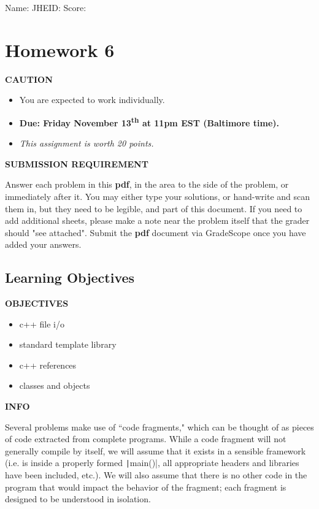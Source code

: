 \documentclass[12pt]{article}
\def \HWNumber {6}
\def \HWDueDate {Friday November 13\textsuperscript{th} at 11pm EST (Baltimore time)}
\newenvironment{caution}{\par\begin{mdframed}[linewidth=1pt,linecolor=YellowOrange]%
		\begin{list}{}{\leftmargin=0cm}\item[\Large\bcdanger]}
		{\end{list}\end{mdframed}\par}
\newenvironment{danger}{\par\begin{mdframed}[linewidth=1pt,linecolor=Red]%
		\begin{list}{}{\leftmargin=0cm}\item[\Large\bcbombe]}
		{\end{list}\end{mdframed}\par}
\newenvironment{tip}{\par\begin{mdframed}[linewidth=1pt,linecolor=ForestGreen]%
		\begin{list}{}{\leftmargin=0cm}\item[\Large\bclampe]}
		{\end{list}\end{mdframed}\par}
\newenvironment{info}{\par\begin{mdframed}[linewidth=1pt,linecolor=Cerulean]%
		\begin{list}{}{\leftmargin=0cm}\item[\Large\bcinfo]}
		{\end{list}\end{mdframed}\par}
\def \SName {}
\def \JHEID {}
\begin{document}
\noindent Name: \framebox[5.5cm]{\SName\rule{0pt}{12pt}} \hfill
JHEID: \framebox[3cm]{\JHEID\rule{0pt}{12pt}}\hfill
Score: \framebox[2cm]{\rule{0pt}{12pt}}

\section*{Homework \HWNumber}

\begin{caution}
	\textbf{CAUTION}
	
	\begin{itemize}
		\item You are expected to work individually.
		\item \textbf{Due: \HWDueDate.}
		\item \textit{This assignment is worth 20 points. }
	\end{itemize}
\end{caution}

\begin{danger}
	\textbf{SUBMISSION REQUIREMENT}
	
	Answer each problem in this \textbf{pdf}, in the area to the side of the problem, or immediately after it.  You may either type your solutions, or hand-write and scan them in, but they need to be legible, and part of this document. If you need to add additional sheets, please make a note near the problem itself that the grader should "see attached". Submit the \textbf{pdf} document via GradeScope once you have added your answers.
\end{danger}

\subsection*{Learning Objectives}
\begin{tip}
	\textbf{OBJECTIVES}
	
	\begin{itemize}
		\item c++ file i/o
		\item standard template library
		\item c++ references
		\item classes and objects
	\end{itemize}
\end{tip}

\begin{info}
	\textbf{INFO}
	
	Several problems make use of “code fragments," which can be thought of as pieces of code extracted from complete programs. While a code fragment will not generally compile by itself, we will assume that it exists in a sensible framework (i.e. is inside a properly formed \texttt|main()|, all appropriate headers and libraries have been included, etc.). We will also assume that there is no other code in the program that would impact the behavior of the fragment; each fragment is designed to be understood in isolation.
\end{info}
\end{document}
